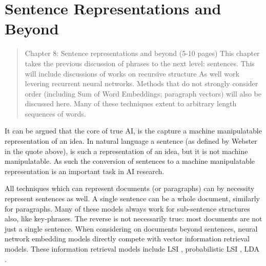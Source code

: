 \documentclass[12pt,parskip]{komatufte}
\begin{document}
\chapter{Sentence Representations and Beyond}\label{sec:sentence-representations-and-beyond}
\begin{abstract}
	Chapter 8: Sentence representations and beyond (5-10 pages)
	This chapter takes the previous discussion of phrases to the next level: sentences.
	This will include discussions of works on recursive structure
	As well work levering recurrent neural networks.
	Methods that do not strongly consider order (including Sum of Word Embeddings; paragraph vectors) will also be discussed here.
	Many of these techniques extent to arbitrary length sequences of words.
\end{abstract}




It can be argued that the core of true AI,
is the capture a machine manipulatable representation of an idea.
In natural language a sentence (as defined by Webster in the quote above),
is such a representation of an idea, but it is not machine manipulatable.
As such the conversion of sentences to a machine manipulatable representation is an important task in AI research.


All techniques which can represent documents (or paragraphs) can by necessity represent sentences as well.
A single sentence can be a whole document, similarly for paragraphs.
Many of these models always work for sub-sentence structures also, like key-phrases.
The reverse is not necessarily true: most documents are not just a single sentence.
When considering on documents beyond sentences,
neural network embedding models directly compete with vector information retrieval models.
These information retrieval models include LSI , probabilistic LSI ,  LDA .
\end{document}
